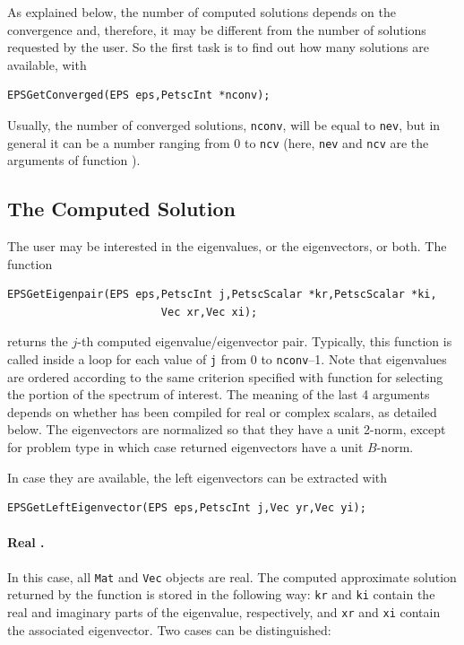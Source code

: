 As explained below, the number of computed solutions depends on the convergence and, therefore, it may be different from the number of solutions requested by the user. So the first task is to find out how many solutions are available, with
        \begin{Verbatim}[fontsize=\small]
        EPSGetConverged(EPS eps,PetscInt *nconv);
        \end{Verbatim}
Usually, the number of converged solutions, \texttt{nconv}, will be equal to \texttt{nev}, but in general it can be a number ranging from 0 to \texttt{ncv} (here, \texttt{nev} and \texttt{ncv} are the arguments of function ).

\subsection{The Computed Solution}

The user may be interested in the eigenvalues, or the eigenvectors, or both. The function
        \begin{Verbatim}[fontsize=\small]
        EPSGetEigenpair(EPS eps,PetscInt j,PetscScalar *kr,PetscScalar *ki,
                        Vec xr,Vec xi);
        \end{Verbatim}
returns the $j$-th computed eigenvalue/eigenvector pair. Typically, this function is called inside a loop for each value of \texttt{j} from 0 to \texttt{nconv}--1. Note that eigenvalues are ordered according to the same criterion specified with function  for selecting the portion of the spectrum of interest.
The meaning of the last 4 arguments depends on whether \slepc has been compiled for real or complex scalars, as detailed below. The eigenvectors are normalized so that they have a unit 2-norm, except for problem type  in which case returned eigenvectors have a unit $B$-norm.

In case they are available, the left eigenvectors can be extracted with
        \begin{Verbatim}[fontsize=\small]
        EPSGetLeftEigenvector(EPS eps,PetscInt j,Vec yr,Vec yi);
        \end{Verbatim}

\paragraph{Real \slepc.} In this case, all \texttt{Mat} and \texttt{Vec} objects are real. The computed approximate solution returned by the function  is stored in the following way: \texttt{kr} and \texttt{ki} contain the real and imaginary parts of the eigenvalue, respectively, and \texttt{xr} and \texttt{xi} contain the associated eigenvector. Two cases can be distinguished:

